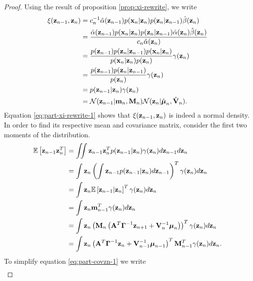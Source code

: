 \documentclass[12pt, oneside]{book}
\numberwithin{equation}{section}
\newcommand{\expectation}[1]{\mathbb{E}\left[#1\right]}
\newcommand{\x}{{\bf x}}
\newcommand{\z}{{\bf z}}
\newcommand{\N}{\mathcal{N}}
\begin{document}
{\begin{proof}
	Using the result of proposition \ref{prop:xi-rewrite}, we write
	\begin{align}
		\xi(\z_{n-1}, \z_n) 
		&= c_n^{-1} \hat\alpha(\z_{n-1}) p(\x_n \vert \z_n) p(\z_n \vert \z_{n-1}) \hat\beta(\z_n) \\
		&= \frac{\hat\alpha(\z_{n-1}) p(\x_n \vert \z_n) p(\z_n \vert \z_{n-1}) \hat\alpha(\z_n)\hat\beta(\z_n)}{c_n \hat\alpha(\z_n)}\\
		&= \frac{p(\z_{n-1}) p(\z_n \vert \z_{n-1}) p(\x_n \vert \z_n)}{p(\x_n \vert \z_n) p(\z_n)} \label{eq:part-xi-rewrite-1}  \gamma(\z_n)\\
		&= \frac{p(\z_{n-1}) p(\z_n \vert \z_{n-1})}{p(\z_n)}  \gamma(\z_n)\\
		&= p(\z_{n-1} \vert \z_n) \gamma(\z_n) \\
		&= \N(\z_{n-1} \vert {\bf m}_n, {\bf M}_n) \N(\z_n \vert \hat{\boldsymbol\mu}_n, \hat{\bf V}_n) \label{eq:part-xi-rewrite}.
	\end{align}
	Equation \eqref{eq:part-xi-rewrite-1} shows that $\xi(\z_{n-1}, \z_n)$ is indeed a normal density. In order to find its respective mean and covariance matrix, consider the first two moments of the distribution.
	\begin{align}
		\expectation{\z_{n-1}\z_n^T} 
		&= \iint \z_{n-1}\z_{n}^T p(\z_{n-1} \vert \z_n) \gamma(\z_n) d\z_{n-1}d\z_n\\
		&= \int \z_n \left(\int \z_{n-1} p(\z_{n-1} \vert \z_n)  d\z_{n-1} \right)^T \gamma(\z_{n}) d\z_n\\
		&= \int \z_n \expectation{\z_{n-1} \vert \z_n}^T \gamma(\z_n) d\z_n\\
		&= \int \z_n {\bf m}_{n-1}^T \gamma(\z_n) d\z_n \\
		&= \int \z_n \left({\bf M}_n \left({\bf A}^T\boldsymbol\Gamma^{-1}\z_{n+1} + {\bf V}_n^{-1}\boldsymbol\mu_n\right)\right)^T \gamma(\z_n) d\z_n\\
		&= \int \z_n \left({\bf A}^T\boldsymbol\Gamma^{-1}\z_{n} + {\bf V}_{n-1}^{-1}\boldsymbol\mu_{n-1}\right)^T {\bf M}_{n-1}^T \gamma(\z_n) d\z_n \label{eq:part-covzn-1}.
	\end{align}
	To simplify equation \eqref{eq:part-covzn-1} we write
	\begin{align}

\end{align}
\end{proof}}
\end{document}

